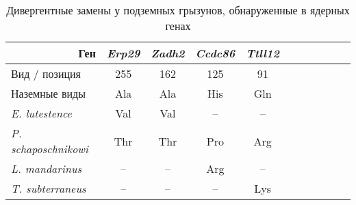 \begin{table}[]
	\caption{Дивергентные замены у подземных грызунов, обнаруженные в ядерных генах}\label{rna_substitution_diff} \vspace{5mm}
	
	\begin{center}
	\begin{tabular}{|l|c|c|c|c|c|c|c|c|c|c}
		\hline
		\multicolumn{1}{|r|}{Ген} & \textit{Erp29} & \textit{Zadh2} & \textit{Ccdc86} & \textit{Ttll12} \\ \hline
		Вид   / позиция & 255 & 162 & 125 &  91 \\ \hline
		Наземные виды & Ala & Ala & His & Gln \\ \hline
		\textit{E. lutestence} & Val & Val & -- & -- \\ \hline
		\textit{P. schaposchnikowi} & Thr & Thr & Pro & Arg \\ \hline
		\textit{L. mandarinus} & -- & -- & Arg  & -- \\ \hline
		\textit{T. subterraneus} & -- & -- & -- & Lys \\ \hline
	\end{tabular}
\end{center}
\end{table}
